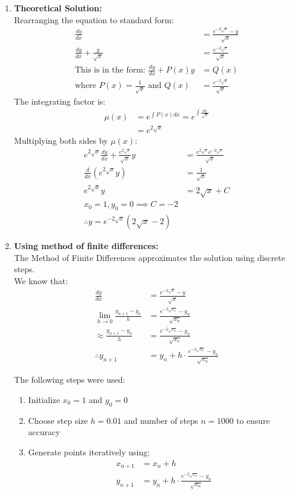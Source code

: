 \documentclass[journal]{IEEEtran}
\begin{document}
\begin{enumerate}
    \item \textbf{Theoretical Solution:}\\
   Rearranging the equation to standard form:
	\begin{align}
		\frac{dy}{dx} &= \frac{e^{-2\sqrt{x}} - y}{\sqrt{x}}\\
        \frac{dy}{dx} + \frac{y}{\sqrt{x}} &= \frac{e^{-2\sqrt{x}}}{\sqrt{x}}\\
        \text{This is in the form: } \frac{dy}{dx} + P(x)y &= Q(x)\\
        \text{where } P(x) = \frac{1}{\sqrt{x}} \text{ and } Q(x) &= \frac{e^{-2\sqrt{x}}}{\sqrt{x}}
    \end{align}
    The integrating factor is:
    \begin{align}
        \mu(x) &= e^{\int P(x)dx} = e^{\int \frac{dx}{\sqrt{x}}}\\
        &= e^{2\sqrt{x}}
    \end{align}
    Multiplying both sides by $\mu(x)$:
    \begin{align}
        e^{2\sqrt{x}}\frac{dy}{dx} + \frac{e^{2\sqrt{x}}}{\sqrt{x}}y &= \frac{e^{2\sqrt{x}}e^{-2\sqrt{x}}}{\sqrt{x}}\\
        \frac{d}{dx}(e^{2\sqrt{x}}y) &= \frac{1}{\sqrt{x}}\\
        e^{2\sqrt{x}}y &= 2\sqrt{x} + C\\
    x_0 = 1, y_0 = 0 \implies C=-2 \\   
   \therefore y = e^{-2\sqrt{x}}(2\sqrt{x} - 2)
    \end{align}   
    \item \textbf{Using method of finite differences:}\\
    The Method of Finite Differences approximates the solution using discrete steps.\\
    We know that:
    \begin{align}
        \frac{dy}{dx} &= \frac{e^{-2\sqrt{x}}-y}{\sqrt{x}}\\
        \lim_{h\to 0}\frac{y_{n+1}-y_n}{h} &= \frac{e^{-2\sqrt{x_n}}-y_n}{\sqrt{x_n}}\\
	    \approx \frac{y_{n+1}-y_n}{h}&=\frac{e^{-2\sqrt{x_n}}-y_n}{\sqrt{x_n}}\\
        \therefore y_{n+1} &= y_n + h\cdot\frac{e^{-2\sqrt{x_n}}-y_n}{\sqrt{x_n}}
    \end{align}
    
    The following steps were used:
    \begin{enumerate}
        \item Initialize $x_0=1$ and $y_0=0$
        \item Choose step size $h=0.01$ and number of steps $n=1000$ to ensure accuracy
        \item Generate points iteratively using:
        \begin{align}
            x_{n+1} &= x_n + h\\
            y_{n+1} &= y_n + h\cdot\frac{e^{-2\sqrt{x_n}}-y_n}{\sqrt{x_n}}
        \end{align}
    \end{enumerate}
    

\end{enumerate}
\end{document}

